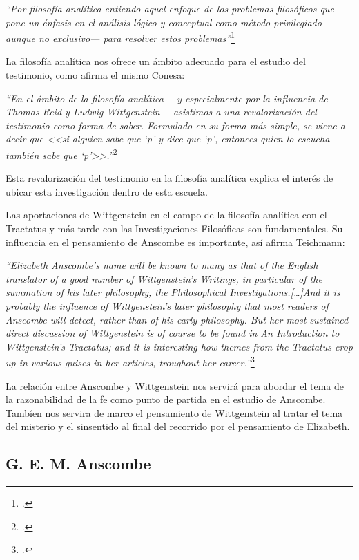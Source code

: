 \documentclass[11pt]{article}
\begin{document}
\emph{
``Por filosofía analítica entiendo aquel enfoque de los problemas filosóficos que pone un énfasis en el análisis lógico y conceptual como método privilegiado \mbox{---aunque} no \mbox{exclusivo---} para resolver estos problemas''}\footcite[16]{cyc}

La filosofía analítica nos ofrece un ámbito adecuado para el estudio del testimonio, como afirma el mismo Conesa:

\emph{
``En el ámbito de la filosofía analítica ---y especialmente por la influencia de Thomas Reid y Ludwig Wittgenstein--- asistimos a una revalorización del testimonio como forma de saber. Formulado en su forma más simple, se viene a decir que <<si alguien sabe que `p' y dice que `p', entonces quien lo escucha también sabe que `p'>>.''}\footcite[487]{feylogicaconesa}

Esta revalorización del testimonio en la filosofía analítica explica el interés de ubicar esta investigación dentro de esta escuela. 

Las aportaciones de Wittgenstein en el campo de la filosofía analítica con el Tractatus y más tarde con las Investigaciones Filosóficas son fundamentales. Su influencia en el pensamiento de Anscombe es importante, así afirma Teichmann:

\emph{
``Elizabeth Anscombe's name will be known to many as that of the English translator of a good number of Wittgenstein's Writings, in particular of the summation of his later philosophy, the Philosophical Investigations.[\ldots]And it is probably the influence of Wittgenstein's later philosophy that most readers of Anscombe will detect, rather than of his early philosophy. But her most sustained direct discussion of Wittgenstein is of course to be found in An Introduction to Wittgenstein's Tractatus; and it is interesting how themes from the Tractatus crop up in various guises in her articles, troughout her career.''}\footcite[191]{teichmann}

La relación entre Anscombe y Wittgenstein nos servirá para abordar el tema de la razonabilidad de la fe como punto de partida en el estudio de Anscombe. Tambíen nos servira de marco el pensamiento de Wittgenstein al tratar el tema del misterio y el sinsentido al final del recorrido por el pensamiento de Elizabeth.

\subsection{G. E. M. Anscombe}
\end{document}

